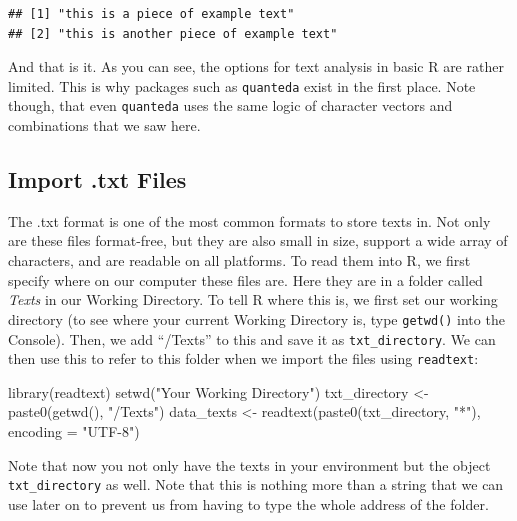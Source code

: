 \documentclass[
]{article}
\newenvironment{Shaded}{\begin{snugshade}}{\end{snugshade}}
\newcommand{\AttributeTok}[1]{\textcolor[rgb]{0.77,0.63,0.00}{#1}}
\newcommand{\FunctionTok}[1]{\textcolor[rgb]{0.00,0.00,0.00}{#1}}
\newcommand{\NormalTok}[1]{#1}
\newcommand{\OtherTok}[1]{\textcolor[rgb]{0.56,0.35,0.01}{#1}}
\newcommand{\StringTok}[1]{\textcolor[rgb]{0.31,0.60,0.02}{#1}}
\begin{document}
\begin{verbatim}
## [1] "this is a piece of example text"      
## [2] "this is another piece of example text"
\end{verbatim}

And that is it. As you can see, the options for text analysis in basic R are rather limited. This is why packages such as \texttt{quanteda} exist in the first place. Note though, that even \texttt{quanteda} uses the same logic of character vectors and combinations that we saw here.

\hypertarget{import-.txt-files}{%
\subsection{Import .txt Files}\label{import-.txt-files}}

The .txt format is one of the most common formats to store texts in. Not only are these files format-free, but they are also small in size, support a wide array of characters, and are readable on all platforms. To read them into R, we first specify where on our computer these files are. Here they are in a folder called \emph{Texts} in our Working Directory. To tell R where this is, we first set our working directory (to see where your current Working Directory is, type \texttt{getwd()} into the Console). Then, we add ``/Texts'' to this and save it as \texttt{txt\_directory}. We can then use this to refer to this folder when we import the files using \texttt{readtext}:

\begin{Shaded}
\begin{Highlighting}[]
\FunctionTok{library}\NormalTok{(readtext)}
\FunctionTok{setwd}\NormalTok{(}\StringTok{"Your Working Directory"}\NormalTok{)}
\NormalTok{txt\_directory }\OtherTok{\textless{}{-}} \FunctionTok{paste0}\NormalTok{(}\FunctionTok{getwd}\NormalTok{(), }\StringTok{"/Texts"}\NormalTok{)}
\NormalTok{data\_texts }\OtherTok{\textless{}{-}} \FunctionTok{readtext}\NormalTok{(}\FunctionTok{paste0}\NormalTok{(txt\_directory, }\StringTok{"*"}\NormalTok{), }\AttributeTok{encoding =} \StringTok{"UTF{-}8"}\NormalTok{)}
\end{Highlighting}
\end{Shaded}

Note that now you not only have the texts in your environment but the object \texttt{txt\_directory} as well. Note that this is nothing more than a string that we can use later on to prevent us from having to type the whole address of the folder.
\end{document}
